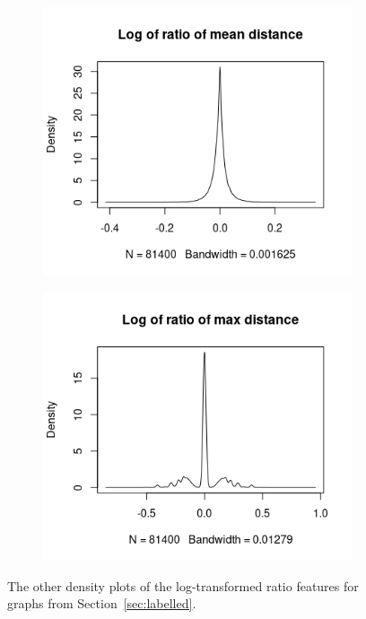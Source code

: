 \documentclass{l4proj}
\theoremstyle{definition}
\theoremstyle{remark}
\begin{document}
\begin{appendices}
\begin{figure}
    \begin{subfigure}[t]{0.49\textwidth}
      \centering
      \includegraphics[width=\textwidth]{images/mcs_ratio_meandist.png}
    \end{subfigure}
    \begin{subfigure}[t]{0.49\textwidth}
      \centering
      \includegraphics[width=\textwidth]{images/mcs_ratio_maxdist.png}
    \end{subfigure}
    \caption{The other density plots of the log-transformed ratio features for
      graphs from Section~\ref{sec:labelled}.}
    \label{fig:mcs_ratio}
  \end{figure}


\end{appendices}
\end{document}

